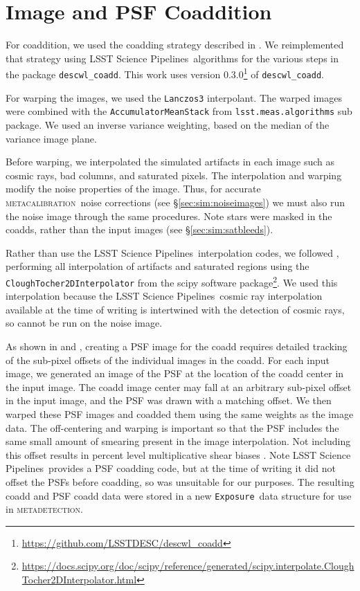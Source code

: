 \documentclass[twocolumn,twocolappendix,astrosym]{openjournal}
\newcommand{\calexp}{\texttt{Exposure}}
\newcommand{\dm}{LSST Science Pipelines}
\newcommand{\mcal}{\textsc{metacalibration}}
\newcommand{\mdet}{\textsc{metadetection}}
\begin{document}
\section{Image and PSF Coaddition} \label{sec:coadding}

For coaddition, we used the coadding strategy described in
\citet{BeckerMdetCoadd}. We reimplemented that strategy using \dm\ algorithms
for the various steps in the package \texttt{descwl\_coadd}. This work uses
version 0.3.0\footnote{\url{https://github.com/LSSTDESC/descwl_coadd}} of
\texttt{descwl\_coadd}.

For warping the images, we used the \texttt{Lanczos3} interpolant. The warped
images were combined with the \texttt{AccumulatorMeanStack} from
\texttt{lsst.meas.algorithms} sub package. We used an inverse variance
weighting, based on the median of the variance image plane.

Before warping, we interpolated the simulated artifacts in each image such as
cosmic rays, bad columns, and saturated pixels.  The interpolation and warping
modify the noise properties of the image.  Thus, for accurate \mcal\ noise
corrections (see \S \ref{sec:sim:noiseimages}) we must also run the noise image
through the same procedures.  Note stars were masked in the coadds, rather than
the input images (see \S \ref{sec:sim:satbleeds}).

Rather than use the \dm\ interpolation codes, we followed \citet{BeckerMdetCoadd},
performing all interpolation of artifacts and saturated regions using the
\texttt{CloughTocher2DInterpolator} from the scipy software
package\footnote{\url{https://docs.scipy.org/doc/scipy/reference/generated/scipy.interpolate.CloughTocher2DInterpolator.html}}.
We used this interpolation because the \dm\ cosmic ray interpolation available
at the time of writing is intertwined with the detection of cosmic rays, so
cannot be run on the noise image.

As shown in \citet{ArmstrongCoadd} and \citet{BeckerMdetCoadd}, creating a PSF
image for the coadd requires detailed tracking of the sub-pixel offsets of the
individual images in the coadd. For each input image, we generated an image of
the PSF at the location of the coadd center in the input image. The coadd image
center may fall at an arbitrary sub-pixel offset in the input image, and the
PSF was drawn with a matching offset.  We then warped these PSF images and
coadded them using the same weights as the image data. The off-centering and
warping is important so that the PSF includes the same small amount of smearing
present in the image interpolation. Not including this offset results in
percent level multiplicative shear biases \citep{ArmstrongCoadd}. Note \dm\
provides a PSF coadding code, but at the time of writing it did not offset the
PSFs before coadding, so was unsuitable for our purposes. The resulting coadd
and PSF coadd data were stored in a new \calexp\ data structure for use in
\mdet.
\end{document}
